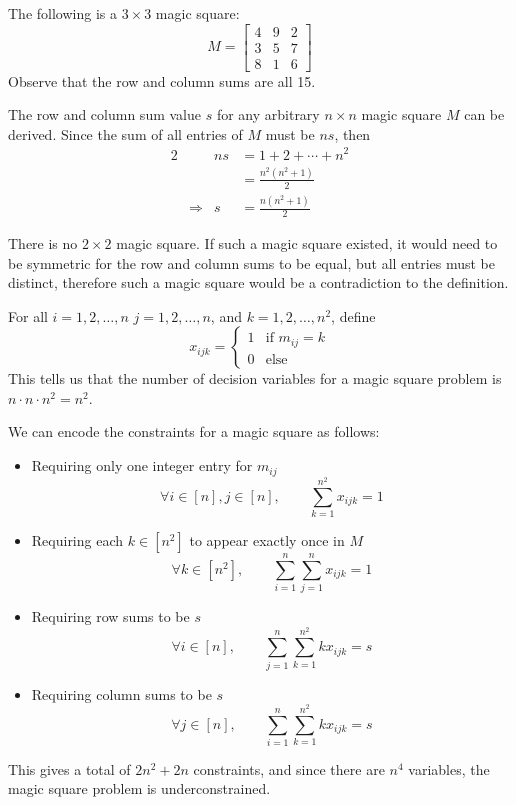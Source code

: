 \begin{exm}
    The following is a $3\times3$ magic square:
    \[
        M = \begin{bmatrix}
                4 & 9 & 2 \\
                3 & 5 & 7 \\
                8 & 1 & 6
            \end{bmatrix}
    \]
    Observe that the row and column sums are all 15.
\end{exm}

\begin{obs}
    The row and column sum value $s$ for any arbitrary $n \times n$ magic square $M$ can be derived. Since the sum of all entries of $M$ must be $ns$, then 
    \begin{alignat*}{2}
        &                   & ns    &= 1 + 2 + \cdots + n^2  \\
        &                   &       &=\frac{n^2(n^2+1)}{2} \\
        & \Longrightarrow   & s     &= \frac{n(n^2+1)}{2}
    \end{alignat*}
\end{obs}

\begin{obs}
    There is no $2 \times 2$ magic square. If such a magic square existed, it would need to be symmetric for the row and column sums to be equal, but all entries must be distinct, therefore such a magic square would be a contradiction to the definition.
\end{obs}

\begin{defn}
    For all $i = 1, 2, \dots, n$ $j = 1,2,\dots,n$, and $k = 1,2,\dots, n^2$, define
    \[
        x_{ijk} = \begin{cases}
                    1 & \text{if } m_{ij} = k \\
                    0 & \text{else}
                  \end{cases}
    \]
    This tells us that the number of decision variables for a magic square problem is $n \cdot n \cdot n^2 = n^2$.
\end{defn}

\noindent We can encode the constraints for a magic square as follows:
\begin{itemize}
    \item Requiring only one integer entry for $m_{ij}$
    \[
        \forall i \in [n], j \in [n], \quad\quad \sum_{k=1}^{n^2} x_{ijk} = 1
    \]
    \item Requiring each $k \in [n^2]$ to appear exactly once in $M$
    \[
        \forall k \in [n^2], \quad\quad \sum_{i=1}^n\sum_{j=1}^n x_{ijk} = 1
    \]
    \item Requiring row sums to be $s$
    \[
        \forall i \in [n], \quad\quad \sum_{j=1}^n\sum_{k=1}^{n^2} kx_{ijk} = s
    \]
    \item Requiring column sums to be $s$
    \[
        \forall j \in [n], \quad\quad \sum_{i=1}^n\sum_{k=1}^{n^2} kx_{ijk} = s
    \]
\end{itemize}
This gives a total of $2n^2 + 2n$ constraints, and since there are $n^4$ variables, the magic square problem is underconstrained.

